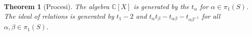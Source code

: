 \documentclass{amsart}
\newtheorem{definition}{Definition}
\newtheorem{theorem}{Theorem}
\newtheorem{remark}{Remark}
\newcommand{\C}{\mathbb{C}}
\begin{document}
\begin{theorem}[Procesi]
The algebra $\C[X]$ is generated by the $t_\alpha$ for $\alpha\in \pi_1(S)$. The ideal of relations is generated by $t_1-2$ and $t_\alpha t_\beta-t_{\alpha\beta}-t_{\alpha\beta^{-1}}$ for all $\alpha,\beta\in \pi_1(S)$. 
\end{theorem}



%
%


\end{document}
